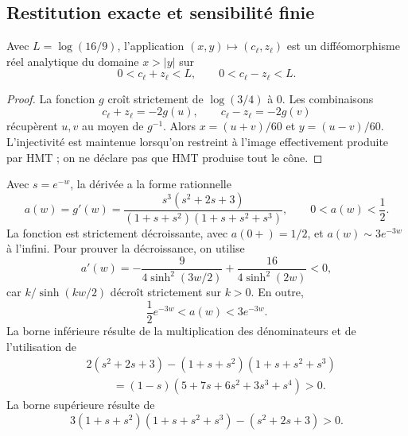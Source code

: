 \subsection{Restitution exacte et sensibilité finie}
\label{md:comp:restitucion}

\begin{proposition}
\label{md:comp:prop-restitucion}
Avec \(L=\log(16/9)\), l’application
\((x,y)\longmapsto(c_\ell,z_\ell)\) est un difféomorphisme réel analytique
du domaine \(x>|y|\) sur
\begin{equation}
 0<c_\ell+z_\ell<L,\qquad 0<c_\ell-z_\ell<L.
 \label{md:comp:imagen-logaritmica}
\end{equation}
\end{proposition}
\begin{proof}
La fonction \(g\) croît strictement de \(\log(3/4)\) à \(0\).
Les combinaisons
\[
 c_\ell+z_\ell=-2g(u),\qquad c_\ell-z_\ell=-2g(v)
\]
récupèrent \(u,v\) au moyen de \(g^{-1}\). Alors
\(x=(u+v)/60\) et \(y=(u-v)/60\).
L’injectivité est maintenue lorsqu’on restreint à l’image effectivement
produite par HMT ; on ne déclare pas que HMT produise tout le cône.
\end{proof}

Avec \(s=e^{-w}\), la dérivée a la forme rationnelle
\begin{equation}
 a(w)=g'(w)=
 \frac{s^3(s^2+2s+3)}{(1+s+s^2)(1+s+s^2+s^3)},
 \qquad 0<a(w)<\frac12.
 \label{md:comp:derivada-racional}
\end{equation}
La fonction est strictement décroissante, avec \(a(0+)=1/2\), et
\(a(w)\sim3e^{-3w}\) à l’infini. Pour prouver la décroissance,
on utilise
\begin{equation}
 a'(w)=-\frac{9}{4\sinh^2(3w/2)}
        +\frac{16}{4\sinh^2(2w)}<0,
 \label{md:comp:decrecimiento}
\end{equation}
car \(k/\sinh(kw/2)\) décroît strictement sur \(k>0\).
En outre,
\begin{equation}
 \frac12e^{-3w}<a(w)<3e^{-3w}.
 \label{md:comp:cotas-exponenciales}
\end{equation}
La borne inférieure résulte de la multiplication des dénominateurs et de l’utilisation de
\begin{equation}
 \begin{split}
 &2(s^2+2s+3)-(1+s+s^2)(1+s+s^2+s^3)\\
 &\hspace{1cm}=(1-s)(5+7s+6s^2+3s^3+s^4)>0.
 \end{split}
 \label{md:comp:polinomio-cota}
\end{equation}
La borne supérieure résulte de
\[
 3(1+s+s^2)(1+s+s^2+s^3)-(s^2+2s+3)>0.
\]


